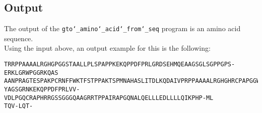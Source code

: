\subsection*{Output}

The output of the \texttt{gto\char`_amino\char`_acid\char`_from\char`_seq} program is an amino acid sequence.\\
Using the input above, an output example for this is the following:
\begin{lstlisting}
TRRPPAAAALRGHGPGGSTAALLPLSPAPPKEKQPPDFPRLGRDSEHMQEAAGSGLSGPPGPS-ERKLGRWPGGRKQAS
AANPRAGTESPAKPCRNFFWKTFSTPPAKTSPMNAHASLITDLKQDAIVPRPPAAAALRGHGHRCPAPGGWPHRPRQRA
YAGSGRNKEKQPPDFPRLVV-VDLPGQCRAPHRRGSSGGGQAAGRRTPPAIRAPGQNALQELLLEDLLLLQIKPHP-ML
TQV-LQT-
\end{lstlisting}
